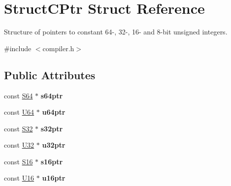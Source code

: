 \hypertarget{struct_struct_c_ptr}{\section{Struct\-C\-Ptr Struct Reference}
\label{struct_struct_c_ptr}
}


Structure of pointers to constant 64-\/, 32-\/, 16-\/ and 8-\/bit unsigned integers.  




{\ttfamily \#include $<$compiler.\-h$>$}

\subsection*{Public Attributes}
\begin{DoxyCompactItemize}
\item 
\hypertarget{struct_struct_c_ptr_ab8f3c8cc59c0cc260d216bcd62a2b367}{const \hyperlink{group__group__xmega__utils_ga1d293e5c494dd6826239b02f5fe98e7f}{S64} $\ast$ {\bfseries s64ptr}}\label{struct_struct_c_ptr_ab8f3c8cc59c0cc260d216bcd62a2b367}

\item 
\hypertarget{struct_struct_c_ptr_a224ab50214c0299652bfab7ac8df4304}{const \hyperlink{group__group__xmega__utils_ga25809e0734a149248fcf5831efa4e33d}{U64} $\ast$ {\bfseries u64ptr}}\label{struct_struct_c_ptr_a224ab50214c0299652bfab7ac8df4304}

\item 
\hypertarget{struct_struct_c_ptr_a1f7b9580c2afcee8403d3a85273eaf1f}{const \hyperlink{group__group__xmega__utils_ga39c786017723555afb9e8b85accec0de}{S32} $\ast$ {\bfseries s32ptr}}\label{struct_struct_c_ptr_a1f7b9580c2afcee8403d3a85273eaf1f}

\item 
\hypertarget{struct_struct_c_ptr_a0c7d3f1b3de836e79a2b5a30d628e0ea}{const \hyperlink{group__group__xmega__utils_ga696390429f2f3b644bde8d0322a24124}{U32} $\ast$ {\bfseries u32ptr}}\label{struct_struct_c_ptr_a0c7d3f1b3de836e79a2b5a30d628e0ea}

\item 
\hypertarget{struct_struct_c_ptr_ae5cffdab3e2e13b6729ed7f3d164cce7}{const \hyperlink{group__group__xmega__utils_ga6d241ad21a823c90d4835380787db5d4}{S16} $\ast$ {\bfseries s16ptr}}\label{struct_struct_c_ptr_ae5cffdab3e2e13b6729ed7f3d164cce7}

\item 
\hypertarget{struct_struct_c_ptr_a3ca52d2813ccddc625296b3e1a419610}{const \hyperlink{group__group__xmega__utils_ga0a0a322d5fa4a546d293a77ba8b4a71f}{U16} $\ast$ {\bfseries u16ptr}}\label{struct_struct_c_ptr_a3ca52d2813ccddc625296b3e1a419610}


\end{DoxyCompactItemize}
